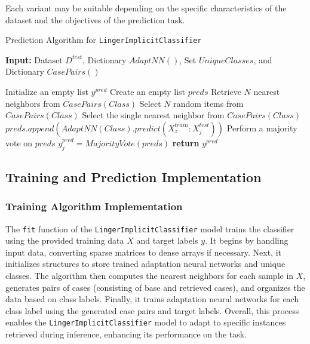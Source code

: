 \documentclass[a4paper, 12pt]{report}
\begin{document}
Each variant may be suitable depending on the specific characteristics of the dataset and the objectives of the prediction task.
\begin{algorithm}[H]
    \caption{Prediction Algorithm for \texttt{LingerImplicitClassifier}}
    \label{alg:LingerImplicitClassifier_predict}
    \textbf{Input:} Dataset $D^{test}$, Dictionary $AdaptNN()$, Set $UniqueClasses$, and Dictionary $CasePairs()$
    \begin{algorithmic}
        \State Initialize an empty list $y^{pred}$
            \State Create an empty list $preds$
                    \State Retrieve $N$ nearest neighbors from $CasePairs(Class)$
                    \State Select $N$ random items from $CasePairs(Class)$
                    \State Select the single nearest neighbor from $CasePairs(Class)$
                \EndIf
                        \State $preds.append(AdaptNN(Class).predict(X^{train}_z:X^{test}_j))$
                    \EndFor
                \EndFor
                \State Perform a majority vote on $preds$
                \State $y^{pred}_j = MajorityVote(preds)$
            \EndFor
        \EndFor
        \State \textbf{return} $y^{pred}$
    \end{algorithmic}
\end{algorithm}
\subsection{Training and Prediction Implementation}

\subsubsection{Training Algorithm Implementation}
\label{sec:training_implementation_LIC}
The \texttt{fit} function of the \texttt{LingerImplicitClassifier} model trains the classifier using the provided training data $X$ and target labels $y$. 
It begins by handling input data, converting sparse matrices to dense arrays if necessary. 
Next, it initializes structures to store trained adaptation neural networks and unique classes. 
The algorithm then computes the nearest neighbors for each sample in $X$, generates pairs of cases (consisting of base and retrieved cases), 
and organizes the data based on class labels. Finally, it trains adaptation neural networks for each class label using the generated case pairs and target labels. 
Overall, this process enables the \texttt{LingerImplicitClassifier} model to adapt to specific instances retrieved during inference, 
enhancing its performance on the task.
\end{document}
